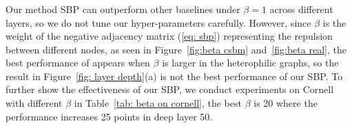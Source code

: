 




\subsubsection{}
Our method SBP can outperform other baselines under $\beta=1$ across different layers, so we do not tune our hyper-parameters carefully.
However, since $\beta$ is the weight of the negative adjacency matrix (\eqref{eq: sbp}) representing the repulsion between different nodes, as seen in Figure~\ref{fig:beta csbm} and~\ref{fig:beta real}, the best performance of \ours appears when $\beta$ is larger in the heterophilic graphs, so the result in Figure~\ref{fig: layer depth}(a) is not the best performance of our SBP.
To further show the effectiveness of our SBP, we conduct experiments on Cornell with different $\beta$ in Table~\ref{tab: beta on cornell}, the best $\beta$ is 20 where the performance increases 25 points in deep layer 50.

